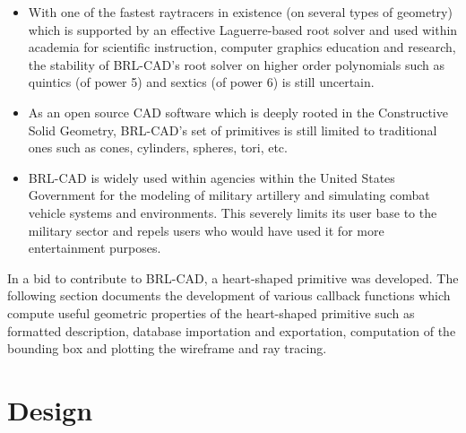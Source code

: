 \begin{itemize}
\item With   one   of   the   fastest   ray­tracers   in   existence   (on   several   types   of  
geometry)   which   is   supported   by   an   effective   Laguerre-­based   root   solver  
and   used   within   academia   for   scientific   instruction,   computer   graphics  
education   and   research,   the   stability   of   BRL­-CAD's   root   solver   on  
higher ­order   polynomials   such   as   quintics   (of   power   5)   and   sextics   (of  
power 6) is still uncertain.

\item As   an   open   source   CAD   software   which   is   deeply   rooted   in   the  
Constructive   Solid   Geometry,   BRL-­CAD's   set   of   primitives   is   still   limited  
to traditional ones such as cones, cylinders, spheres, tori, etc.

\item BRL­-CAD   is   widely   used   within   agencies   within   the   United   States  
Government   for   the   modeling   of   military   artillery   and   simulating   combat  vehicle   systems   and   environments.   This   severely limits   its   user   base   to  the   military   sector   and   repels   users   who  would have used it for more entertainment purposes.
\end{itemize}

In a bid to contribute to BRL-CAD, a heart-­shaped primitive was developed. 
The following section documents the development of various callback functions which compute   useful  
geometric   properties   of   the   heart-­shaped   primitive   such   as   formatted  
description,   database   importation   and   exportation,   computation   of   the   bounding  
box and plotting the wireframe and ray tracing.


\section{Design}

